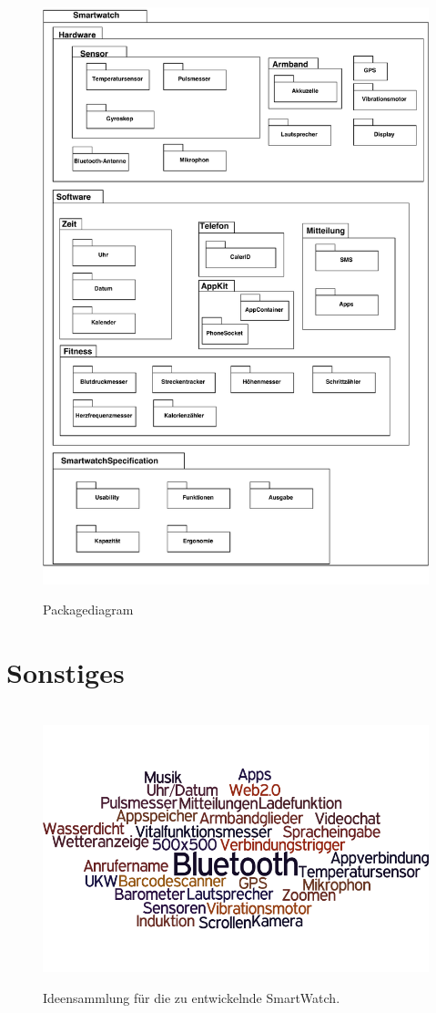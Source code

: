 \begin{appendices}
\begin{figure}[h]
\centering\
\includegraphics[width=\textwidth]{img/PackagePhase2}
\caption{Packagediagram}\label{fig:package_phase2}
\end{figure}

\section{Sonstiges}

\begin{figure}[h]
\centering\
\includegraphics[width=\textwidth]{img/tagcloud}
\caption{Ideensammlung für die zu entwickelnde SmartWatch.}\label{fig:tagcloud}
\end{figure}

\end{appendices}
